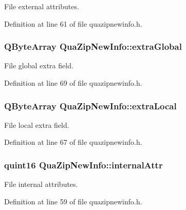 File external attributes. 



Definition at line 61 of file quazipnewinfo.\-h.

\hypertarget{struct_qua_zip_new_info_abda207eb3949db3a88761c1b06e6bd58}{
\subsubsection[{extra\-Global}]{\setlength{\rightskip}{0pt plus 5cm}Q\-Byte\-Array Qua\-Zip\-New\-Info\-::extra\-Global}}\label{struct_qua_zip_new_info_abda207eb3949db3a88761c1b06e6bd58}


File global extra field. 



Definition at line 69 of file quazipnewinfo.\-h.

\hypertarget{struct_qua_zip_new_info_ab377a81c51cf495c7aeee4f19340a43f}{
\subsubsection[{extra\-Local}]{\setlength{\rightskip}{0pt plus 5cm}Q\-Byte\-Array Qua\-Zip\-New\-Info\-::extra\-Local}}\label{struct_qua_zip_new_info_ab377a81c51cf495c7aeee4f19340a43f}


File local extra field. 



Definition at line 67 of file quazipnewinfo.\-h.

\hypertarget{struct_qua_zip_new_info_a59ce9776c2ac7547ade8cb4c404c77ab}{
\subsubsection[{internal\-Attr}]{\setlength{\rightskip}{0pt plus 5cm}quint16 Qua\-Zip\-New\-Info\-::internal\-Attr}}\label{struct_qua_zip_new_info_a59ce9776c2ac7547ade8cb4c404c77ab}


File internal attributes. 



Definition at line 59 of file quazipnewinfo.\-h.

